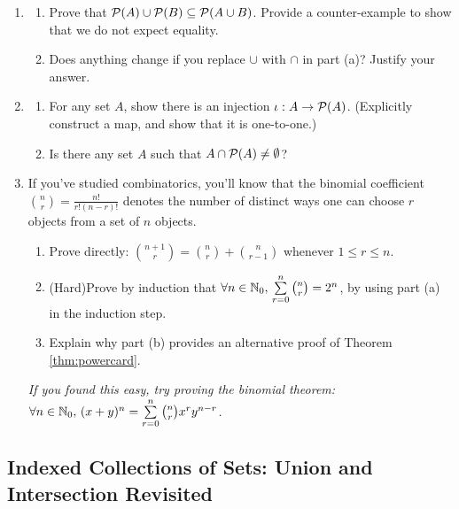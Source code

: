 \begin{exercises}{}{}
\begin{enumerate}
	
		\item\begin{enumerate}
		  \item Prove that $\mathcal{P}(A)\cup\mathcal{P}(B)\subseteq\mathcal{P}(A\cup B)$. Provide a counter-example to show that we do not expect equality.
		  \item Does anything change if you replace $\cup$ with $\cap$ in part (a)? Justify your answer.
		\end{enumerate}
	
	
 
		\item\begin{enumerate}
			\item For any set $A$, show there is an injection $\iota : A \to \mathcal{P}(A)$. (Explicitly construct a map, and show that it is one-to-one.)
			\item Is there any set $A$ such that $A \cap \mathcal{P}(A) \neq \emptyset$?
		\end{enumerate}

	
		\item\label{ex:binom} If you've studied combinatorics, you'll know that the binomial coefficient $\binom nr=\frac{n!}{r!(n-r)!}$ denotes the number of distinct ways one can choose $r$ objects from a set of $n$ objects.
		\begin{enumerate}
		  \item Prove directly: $\binom{n+1}r=\binom nr+\binom n{r-1}$ whenever $1\le r\le n$.
			\item (Hard)\lstsp Prove by induction that $\forall n\in\mathbb{N}_0,\,\sum\limits_{r=0}^n\binom nr=2^n$, by using part (a) in the induction step.
			\item Explain why part (b) provides an alternative proof of Theorem \ref{thm:powercard}.
		\end{enumerate}
		\emph{If you found this easy, try proving the binomial theorem: $\forall n\in\mathbb{N}_0,\,(x+y)^n=\sum\limits_{r=0}^n\binom nrx^ry^{n-r}$.}

	\end{enumerate}

\end{exercises}


\clearpage



\subsection{Indexed Collections of Sets: Union and Intersection Revisited}\label{sec:indexed}

